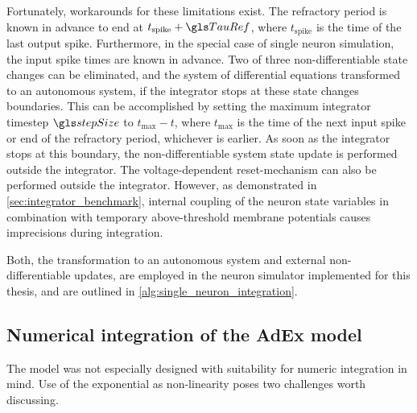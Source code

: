 Fortunately, workarounds for these limitations exist. The refractory period is known in advance to end at $t_\mathrm{spike} + \TauRef$, where $t_\mathrm{spike}$ is the time of the last output spike. Furthermore, in the special case of single neuron simulation, the input spike times \tIn are known in advance. Two of three non-differentiable state changes can be eliminated, and the system of differential equations transformed to an autonomous system, if the integrator stops at these state changes boundaries. This can be accomplished by setting the maximum integrator timestep $\stepSize$ to $t_\mathrm{max} - t$, where $t_\mathrm{max}$ is the time of the next input spike or end of the refractory period, whichever is earlier. As soon as the integrator stops at this boundary, the non-differentiable system state update is performed outside the integrator. The voltage-dependent reset-mechanism can also be performed outside the integrator. However, as demonstrated in \cref{sec:integrator_benchmark}, internal coupling of the neuron state variables in combination with temporary above-threshold membrane potentials causes imprecisions during integration.

Both, the transformation to an autonomous system and external non-differentiable updates, are employed in the neuron simulator implemented for this thesis, and are outlined in \cref{alg:single_neuron_integration}.

\subsection{Numerical integration of the AdEx model}
\label{sec:adex_numerical}

The \AdEx model was not especially designed with suitability for numeric integration in mind. Use of the exponential as non-linearity poses two challenges worth discussing.

